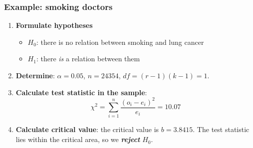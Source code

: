 \documentclass{beamer}
\begin{document}
\begin{frame}
  \frametitle{Example: smoking doctors}
  \begin{enumerate}
  \item \textbf{Formulate hypotheses}
    \begin{itemize}
      \item $H_{0}$: there is no relation between smoking and lung cancer
      \item $H_{1}$: there \emph{is} a relation between them
    \end{itemize}
  \item \textbf{Determine}: $\alpha = 0.05$, $n = 24354$, $df = (r-1)(k-1) = 1$.
  \item \textbf{Calculate test statistic in the sample}:
  \[ \chi^{2} = \sum_{i=1}^{n} \frac{(o_{i} - e_{i})^{2}}{e_{i}} = 10.07 \]
  \item \textbf{Calculate critical value}: the critical value is $b = 3.8415$. The test statistic lies within the critical area, so we \textbf{\textit{reject}} $H_{0}$.
\end{enumerate}
\end{frame}
\end{document}
